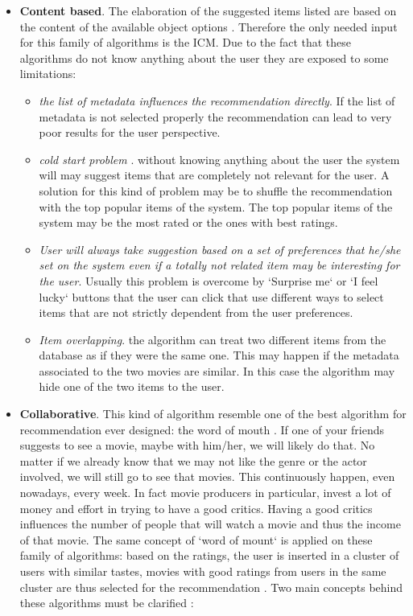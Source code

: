 \begin{itemize}
\item \textbf{Content based}. The elaboration of the suggested items listed are based on the content of the available object options \cite{content-based-recommendation-systems}. Therefore the only needed input for this family of algorithms is the \ac{ICM}. Due to the fact that these algorithms do not know anything about the user they are exposed to some limitations:

  \begin{itemize}
  \item \textit{the list of metadata influences the recommendation directly}. If the list of metadata is not selected properly the recommendation can lead to very poor results for the user perspective.
  \item \textit{cold start problem} \cite{cold-start-recommendations}. without knowing anything about the user the system will may suggest items that are completely not relevant for the user. A solution for this kind of problem may be to shuffle the recommendation with the top popular items of the system. The top popular items of the system may be the most rated or the ones with best ratings.
  \item \textit{User will always take suggestion based on a set of preferences that he/she set on the system even if a totally not related item may be interesting for the user}. Usually this problem is overcome by `Surprise me` or `I feel lucky` buttons that the user can click that use different ways to select items that are not strictly dependent from the user preferences.
  \item \textit{Item overlapping}. the algorithm can treat two different items from the database as if they were the same one. This may happen if the metadata associated to the two movies are similar. In this case the algorithm may hide one of the two items to the user.
  \end{itemize}

\item \textbf{Collaborative}. This kind of algorithm resemble one of the best algorithm for recommendation ever designed: the word of mouth \cite{social-information-filtering}. If one of your friends suggests to see a movie, maybe with him/her, we will likely do that. No matter if we already know that we may not like the genre or the actor involved, we will still go to see that movies. This continuously happen, even nowadays, every week. In fact movie producers in particular, invest a lot of money and effort in trying to have a good critics. Having a good critics influences the number of people that will watch a movie and thus the income of that movie. The same concept of `word of mount` is applied on these family of algorithms: based on the ratings, the user is inserted in a cluster of users with similar tastes, movies with good ratings from users in the same cluster are thus selected for the recommendation \cite{using-collaborative-filtering}.
Two main concepts behind these algorithms must be clarified \cite{analysis-recommender-systems}:


\end{itemize}
